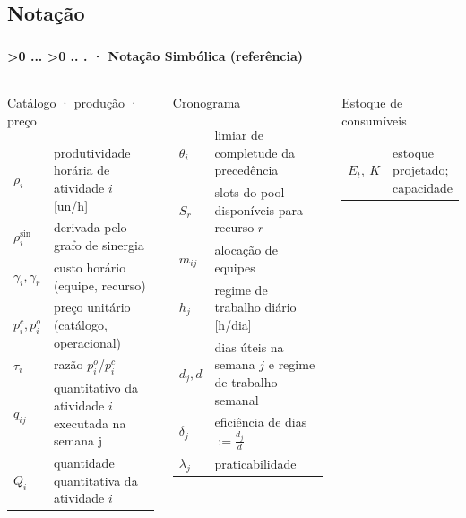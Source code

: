 \documentclass[aspectratio=169,10pt]{beamer}
\newcounter{mlc3}[subsection]
\newcounter{mlc4}[mlc3]
\newcommand{\pathnum}{%
  \ifnum\value{mlc4}>0
    \thesection.\thesubsection.\arabic{mlc3}.\arabic{mlc4}%
  \else\ifnum\value{mlc3}>0
    \thesection.\thesubsection.\arabic{mlc3}%
  \else
    \thesection.\thesubsection%
  \fi\fi
}
\newcommand{\mtitle}[1]{%
  \frametitle{\insertsection}%
  \framesubtitle{\pathnum\;·\; #1}}
\begin{document}
\subsection{Notação}
\begin{frame}
  \mtitle{Notação Simbólica (referência)}
  \scriptsize
  \begin{columns}[T]
    \begin{block}{\small Catálogo · produção · preço}
      \begin{tabular}{@{}p{1.5cm}p{4.6cm}@{}}
        $\rho_i$ & produtividade horária de atividade $i$ [un/h] \\
        $\rho^{\text{sin}}_i$ & derivada pelo grafo de sinergia \\
        $\gamma_i,\gamma_r$ & custo horário (equipe, recurso) \\
        $p_i^c, p_i^o$ & preço unitário (catálogo, operacional) \\
        $\tau_i$ & razão $p_i^o$/$p_i^c$ \\
        $q_{ij}$ & quantitativo da atividade $i$ executada na semana j \\
        $Q_i$ & quantidade quantitativa da atividade $i$ \\
      \end{tabular}
    \end{block}
    \begin{block}{\small Cronograma}
      \begin{tabular}{@{}p{1.5cm}p{4.6cm}@{}}
        $\theta_i$ & limiar de completude da precedência \\
        $S_r$ & slots do pool disponíveis para recurso $r$ \\
        $m_{ij}$ & alocação de equipes \\
        $h_j$ & regime de trabalho diário [h/dia] \\
        $d_j, d$ & dias úteis na semana $j$ e regime de trabalho semanal \\
        $\delta_j$ & eficiência de dias $:= \frac{d_j}{d}$ \\
        $\lambda_j$ & praticabilidade \\
      \end{tabular}
    \end{block}
    \begin{block}{\small Estoque de consumíveis}
      \begin{tabular}{@{}p{1.5cm}p{4.6cm}@{}}
        $E_t,\ K$ & estoque projetado; capacidade \\

\end{tabular}
\end{block}
\end{columns}
\end{frame}
\end{document}
